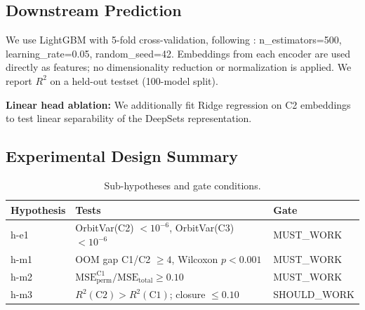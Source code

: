 \subsection{Downstream Prediction}

We use LightGBM with 5-fold cross-validation, following \citet{Unterthiner2020Predicting}: n\_estimators=500, learning\_rate=0.05, random\_seed=42. Embeddings from each encoder are used directly as features; no dimensionality reduction or normalization is applied. We report $R^2$ on a held-out testset (100-model split).

\textbf{Linear head ablation:} We additionally fit Ridge regression on C2 embeddings to test linear separability of the DeepSets representation.

\subsection{Experimental Design Summary}

\begin{table}[h]
\centering
\caption{Sub-hypotheses and gate conditions.}
\label{tab:gates}
\begin{tabular}{lll}
\toprule
Hypothesis & Tests & Gate \\
\midrule
h-e1 & OrbitVar(C2) $< 10^{-6}$, OrbitVar(C3) $< 10^{-6}$ & MUST\_WORK \\
h-m1 & OOM gap C1/C2 $\ge 4$, Wilcoxon $p < 0.001$ & MUST\_WORK \\
h-m2 & $\text{MSE}_\text{perm}^\text{C1}/\text{MSE}_\text{total} \ge 0.10$ & MUST\_WORK \\
h-m3 & $R^2(\text{C2}) > R^2(\text{C1})$; closure $\le 0.10$ & SHOULD\_WORK \\
\bottomrule
\end{tabular}
\end{table}
